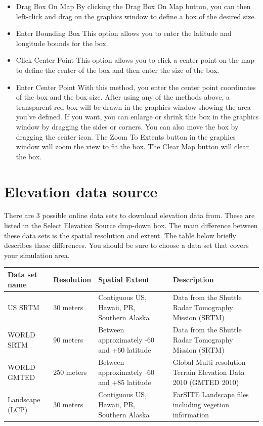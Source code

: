 \documentclass[12pt,oneside,final]{article}
\begin{document}
\begin{itemize}
    \item{Drag Box On Map}
        By clicking the Drag Box On Map button, you can then left-click and
        drag on the graphics window to define a box of the desired size.
    \item{Enter Bounding Box}
        This option allows you to enter the latitude and longitude bounds for
        the box.
    \item{Click Center Point}
        This option allows you to click a center point on the map to define the
        center of the box and then enter the size of the box.
    \item{Enter Center Point}
        With this method, you enter the center point coordinates of the box and
        the box size.  After using any of the methods above, a transparent red
        box will be drawn in the graphics window showing the area you've
        defined.  If you want, you can enlarge or shrink this box in the
        graphics window by dragging the sides or corners.  You can also move
        the box by dragging the center icon.  The Zoom To Extents button in the
        graphics window will zoom the view to fit the box. The Clear Map button
        will clear the box.
\end{itemize}

\section{Elevation data source}

There are 3 possible online data sets to download elevation data from.  These
are listed in the Select Elevation Source drop-down box.  The main difference
between these data sets is the spatial resolution and extent.  The table below
briefly describes these differences.  You should be sure to choose a data set
that covers your simulation area.

\begin{center}
    \begin{tabular}{| l | l | p{1.75in} | p{1.75in} |}
    \hline
    Data set name & Resolution & Spatial Extent & Description \\ \hline

    US SRTM & 30 meters  & Contiguous US, Hawaii, PR, Southern Alaska &
    Data from the Shuttle Radar Tomography Mission (SRTM) \\ \hline

    WORLD SRTM & 90 meters & Between approximately -60 and +60 latitude &
    Data from the Shuttle Radar Tomography Mission (SRTM) \\ \hline

    WORLD GMTED & 250 meters & Between approximately -60 and +85 latitude &
    Global Multi-resolution Terrain Elevation Data 2010 (GMTED 2010) \\ \hline

    Landscape (LCP) & 30 meters & Contiguous US, Hawaii, PR, Southern Alaska &
    FarSITE Landscape files including vegetion information \\ \hline
\end{tabular}
\end{center}
\end{document}
